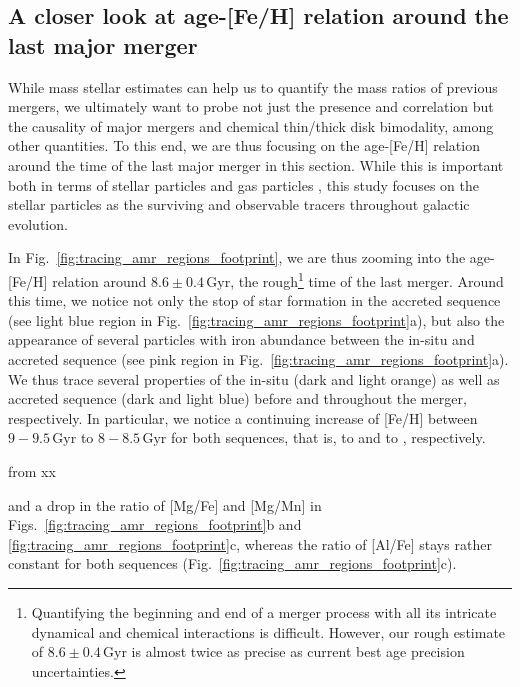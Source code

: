 \documentclass[fleqn,usenatbib]{mnras}
\begin{document}
\subsection{A closer look at age-[Fe/H] relation around the last major merger} \label{sec:discussion_zoom_at_mergertime}

While mass stellar estimates can help us to quantify the mass ratios of previous mergers, we ultimately want to probe not just the presence and correlation but the causality of major mergers and chemical thin/thick disk bimodality, among other quantities. To this end, we are thus focusing on the age-[Fe/H] relation around the time of the last major merger in this section. While this is important both in terms of stellar particles and gas particles \citep[see e.g. the study by][]{Buck2023}, this study focuses on the stellar particles as the surviving and observable tracers throughout galactic evolution.

In Fig.~\ref{fig:tracing_amr_regions_footprint}, we are thus zooming into the age-[Fe/H] relation around $8.6\pm0.4\,\mathrm{Gyr}$, the rough\footnote{Quantifying the beginning and end of a merger process with all its intricate dynamical and chemical interactions is difficult. However, our rough estimate of $8.6\pm0.4\,\mathrm{Gyr}$ is almost twice as precise as current best age precision uncertainties.} time of the last merger. Around this time, we notice not only the stop of star formation in the accreted sequence (see light blue region in Fig.~\ref{fig:tracing_amr_regions_footprint}a), but also the appearance of several particles with iron abundance between the in-situ and accreted sequence (see pink region in Fig.~\ref{fig:tracing_amr_regions_footprint}a). We thus trace several properties of the in-situ (dark and light orange) as well as accreted sequence (dark and light blue) before and throughout the merger, respectively. In particular, we notice a continuing increase of [Fe/H] between $9-9.5\,\mathrm{Gyr}$ to $8-8.5\,\mathrm{Gyr}$ for both sequences, that is,  to  and  to , respectively.

from xx 



and a drop in the ratio of [Mg/Fe] and [Mg/Mn] in Figs.~\ref{fig:tracing_amr_regions_footprint}b and \ref{fig:tracing_amr_regions_footprint}c, whereas the ratio of [Al/Fe] stays rather constant for both sequences (Fig.~\ref{fig:tracing_amr_regions_footprint}c).
\end{document}
